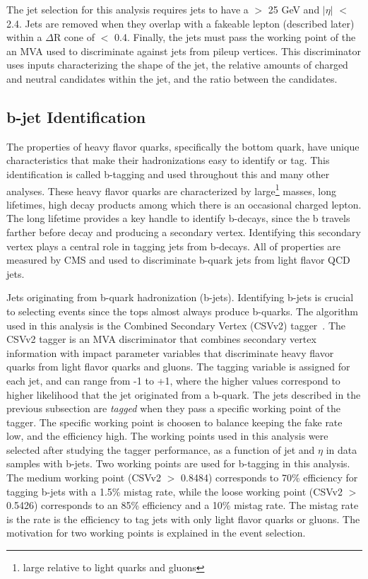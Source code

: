 The jet selection for this analysis requires jets to have a \pt $>$ 25 GeV and $|\eta|$ $<$ 2.4. Jets are removed when they overlap with a fakeable lepton (described later) within
a $\Delta$R cone of $<$ 0.4. Finally, the jets must pass the working point of the an MVA used to discriminate against jets from pileup vertices. This discriminator uses inputs
characterizing the shape of the jet, the relative amounts of charged and neutral candidates within the jet, and the \pt ratio between the candidates. 

\subsection{b-jet Identification}
The properties of heavy flavor quarks, specifically the bottom quark, have unique characteristics that make their hadronizations easy to identify or tag. This identification is called
b-tagging and used throughout this and many other analyses. These heavy flavor quarks are characterized by large\footnote{large relative to light quarks and gluons} masses,
long lifetimes, high \pt decay products among which there is an occasional charged lepton. The long lifetime provides a key handle to identify b-decays, since the b travels farther before
decay and producing a secondary vertex. Identifying this secondary vertex plays a central role in tagging jets from b-decays. All of properties are measured by CMS and used to discriminate b-quark jets
from light flavor QCD jets. 

Jets originating from b-quark hadronization (b-jets). Identifying b-jets is crucial to selecting \tth events since the tops
almost always produce b-quarks. The algorithm used in this analysis is the Combined Secondary Vertex (CSVv2) tagger~\cite{csvv2}. The CSVv2 tagger is an MVA discriminator that
combines secondary vertex information with impact parameter variables that discriminate heavy flavor quarks from light flavor quarks and gluons. The tagging variable is assigned
for each jet, and can range from -1 to +1, where the higher values correspond to higher likelihood that the jet originated from a b-quark. The jets described in the previous
subsection are \emph{tagged} when they pass a specific working point of the tagger. The specific working point is choosen to balance keeping the fake rate low, and the efficiency
high. The working points used in this analysis were selected after studying the tagger performance, as a function of jet \pt and $\eta$ in data samples with b-jets. Two working points
are used for b-tagging in this analysis. The medium working point (CSVv2 $>$ 0.8484) corresponds to 70\% efficiency for tagging
b-jets with a 1.5\% mistag rate, while the loose working point (CSVv2 $>$ 0.5426) corresponds to an 85\% efficiency and a 10\% mistag rate. The mistag rate is the rate is the efficiency
to tag jets with only light flavor quarks or gluons. The motivation for two working points is explained in the event selection. 

